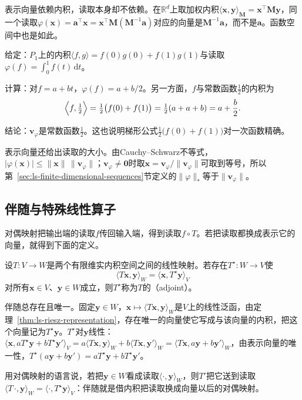 表示向量依赖内积，读取本身却不依赖。在$\mathbb R^d$上取加权内积$\langle\bm x,\bm y\rangle_{\bm M}=\bm x^\top\bm M\bm y$，同一个读取$\varphi(\bm x)=\bm a^\top\bm x=\bm x^\top\bm M(\bm M^{-1}\bm a)$对应的向量是$\bm M^{-1}\bm a$，而不是$\bm a$。函数空间中也是如此。
\begin{example}[积分读取在两点内积下的表示向量]
\label{ex:ls-riesz-integral-two-point}
给定：$P_1$上的内积$\langle f,g\rangle=f(0)g(0)+f(1)g(1)$与读取$\varphi(f)=\int_0^1f(t)\,\mathrm dt$。

计算：对$f=a+bt$，$\varphi(f)=a+b/2$。另一方面，$f$与常数函数$\tfrac12$的内积为
\[
 \Bigl\langle f,\tfrac12\Bigr\rangle=\tfrac12\bigl(f(0)+f(1)\bigr)=\tfrac12(a+a+b)=a+\frac b2 .
\]

结论：$\bm v_\varphi$是常数函数$\tfrac12$。这也说明梯形公式$\tfrac12\bigl(f(0)+f(1)\bigr)$对一次函数精确。
\end{example}
表示向量还给出读取的大小。由Cauchy--Schwarz不等式，$|\varphi(\bm x)|\leq\lVert\bm x\rVert\,\lVert\bm v_\varphi\rVert$；$\bm v_\varphi\neq\bm0$时取$\bm x=\bm v_\varphi/\lVert\bm v_\varphi\rVert$可取到等号，所以第~\ref{sec:ls-finite-dimensional-sequences}节定义的$\lVert\varphi\rVert_*$等于$\lVert\bm v_\varphi\rVert$。

\subsection{伴随与特殊线性算子}
对偶映射把输出端的读取$f$传回输入端，得到读取$f\circ T$。若把读取都换成表示它的向量，就得到下面的定义。

设$T:V\to W$是两个有限维实内积空间之间的线性映射。若存在$T^\star:W\to V$使
\begin{equation}
 \langle T\bm x,\bm y\rangle_W=\langle\bm x,T^\star\bm y\rangle_V
 \label{eq:ls-adjoint-pairing}
\end{equation}
对所有$\bm x\in V$、$\bm y\in W$成立，则$T^\star$称为$T$的（adjoint）。
\label{def:linear-algebra-adjoint}

伴随总存在且唯一。固定$\bm y\in W$，$\bm x\mapsto\langle T\bm x,\bm y\rangle_W$是$V$上的线性泛函，由定理~\ref{thm:ls-riesz-representation}，存在唯一的向量使它写成与该向量的内积，把这个向量记为$T^\star\bm y$。$T^\star$对$\bm y$线性：$\langle\bm x,aT^\star\bm y+bT^\star\bm y'\rangle_V=a\langle T\bm x,\bm y\rangle_W+b\langle T\bm x,\bm y'\rangle_W=\langle T\bm x,a\bm y+b\bm y'\rangle_W$，由表示向量的唯一性，$T^\star(a\bm y+b\bm y')=aT^\star\bm y+bT^\star\bm y'$。

用对偶映射的语言说，若把$\bm y\in W$看成读取$\langle\cdot,\bm y\rangle_W$，则$T'$把它送到读取$\langle T\,\cdot,\bm y\rangle_W=\langle\cdot,T^\star\bm y\rangle_V$：伴随就是借内积把读取换成向量以后的对偶映射。

